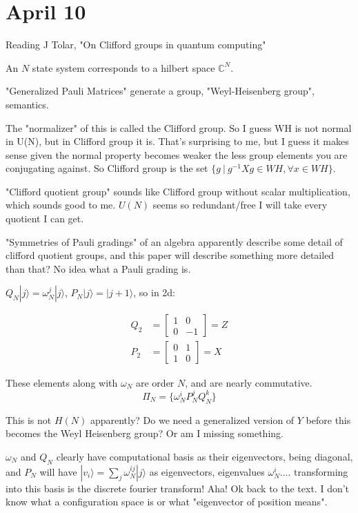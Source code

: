 \documentclass[]{article}
\newcommand{\ket}[1]{| #1 \rangle}
\begin{document}
\setlength{\parskip}{6pt}
\section{April 10}

Reading J Tolar, "On Clifford groups in quantum computing"

An $N$ state system corresponds to a hilbert space $\mathbb{C}^N$.

"Generalized Pauli Matrices" generate a group, "Weyl-Heisenberg group", semantics.

The "normalizer" of this is called the Clifford group. So I guess WH is not normal in U(N), but in Clifford group it is. That's surprising to me, but I guess it makes sense given the normal property becomes weaker the less group elements you are conjugating against. So Clifford group is the set $\{g\ |\ g^{-1}Xg \in \textit{WH}, \forall x \in \textit{WH}\}$.

"Clifford quotient group" sounds like Clifford group without scalar multiplication, which sounds good to me. $U(N)$ seems so redundant/free I will take every quotient I can get.

"Symmetries of Pauli gradings" of an algebra apparently describe some detail of clifford quotient groups, and this paper will describe something more detailed than that? No idea what a Pauli grading is.

$Q_N\ket{j} = \omega_N^j\ket{j}$, $P_N\ket{j} = \ket{j + 1}$, so in 2d:

\begin{align*}
Q_2 &= \left[\begin{matrix}
1 & 0 \\
0 & -1
\end{matrix}\right] = Z
\\P_2 &= \left[\begin{matrix}
0 & 1 \\
1 & 0
\end{matrix}\right] = X
\end{align*}

These elements along with $\omega_N$ are order $N$, and are nearly commutative.
\[\Pi_N = \{\omega_N^i P_N^j Q_N^k\}\]

This is not $H(N)$ apparently? Do we need a generalized version of $Y$ before this becomes the Weyl Heisenberg group? Or am I missing something.

$\omega_N$ and $Q_N$ clearly have computational basis as their eigenvectors, being diagonal, and $P_N$ will have $\ket{v_i} = \sum_j \omega_N^{ij}\ket{j}$ as eigenvectors, eigenvalues $\omega_N^i$.... transforming into this basis is the discrete fourier transform! Aha! Ok back to the text. I don't know what a configuration space is or what "eigenvector of position means".
\end{document}
